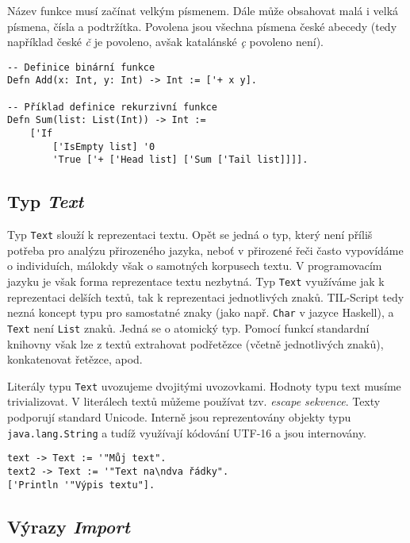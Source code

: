 Název funkce musí začínat velkým písmenem. Dále může obsahovat malá i velká písmena, čísla
a podtržítka. Povolena jsou všechna písmena české abecedy (tedy například české \textit{č} je
povoleno, avšak katalánské \textit{\c{c}} povoleno není).

\begin{lstlisting}[caption={Příklad definice funkcí}]
-- Definice binární funkce
Defn Add(x: Int, y: Int) -> Int := ['+ x y].

-- Příklad definice rekurzivní funkce
Defn Sum(list: List(Int)) -> Int :=
    ['If
        ['IsEmpty list] '0
        'True ['+ ['Head list] ['Sum ['Tail list]]]].
\end{lstlisting}

\subsection{Typ \textit{Text}} \label{text-type}

Typ \lstinline{Text} slouží k reprezentaci textu. Opět se jedná o typ, který není příliš potřeba
pro analýzu přirozeného jazyka, neboť v přirozené řeči často vypovídáme o individuích, málokdy však
o samotných korpusech textu. V programovacím jazyku je však forma reprezentace textu nezbytná.
Typ \lstinline{Text} využíváme jak k reprezentaci delších textů, tak k reprezentaci jednotlivých
znaků. TIL-Script tedy nezná koncept typu pro samostatné znaky (jako např. \lstinline{Char}
v jazyce Haskell), a \lstinline{Text} není \lstinline{List} znaků. Jedná se o atomický typ. Pomocí
funkcí standardní knihovny však lze z textů extrahovat podřetězce (včetně jednotlivých znaků),
konkatenovat řetězce, apod.

Literály typu \lstinline{Text} uvozujeme dvojitými uvozovkami. Hodnoty typu text musíme
trivializovat. V literálech textů můžeme používat tzv. \textit{escape sekvence}. Texty podporují
standard Unicode. Interně jsou reprezentovány objekty typu \lstinline{java.lang.String} a tudíž
využívají kódování UTF-16 a jsou internovány.

\begin{lstlisting}[caption={Příklad využití typu Text}]
text -> Text := '"Můj text".
text2 -> Text := '"Text na\ndva řádky".
['Println '"Výpis textu"].
\end{lstlisting}

\subsection{Výrazy \textit{Import}}


